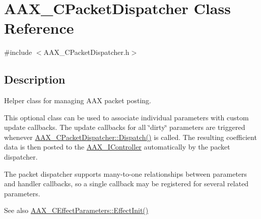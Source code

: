 \hypertarget{a00031}{}\section{A\+A\+X\+\_\+\+C\+Packet\+Dispatcher Class Reference}
\label{a00031}


{\ttfamily \#include $<$A\+A\+X\+\_\+\+C\+Packet\+Dispatcher.\+h$>$}



\subsection{Description}
Helper class for managing A\+A\+X packet posting. 

This optional class can be used to associate individual parameters with custom update callbacks. The update callbacks for all \char`\"{}dirty\char`\"{} parameters are triggered whenever \hyperlink{a00031_aec68e7f8f440e394a3e4ab698a5f06f9}{A\+A\+X\+\_\+\+C\+Packet\+Dispatcher\+::\+Dispatch()} is called. The resulting coefficient data is then posted to the \hyperlink{a00090}{A\+A\+X\+\_\+\+I\+Controller} automatically by the packet dispatcher.

The packet dispatcher supports many-\/to-\/one relationships between parameters and handler callbacks, so a single callback may be registered for several related parameters.

\begin{DoxySeeAlso}{See also}
\hyperlink{a00018_a2e302fd758d39a6a855023bf825fe148}{A\+A\+X\+\_\+\+C\+Effect\+Parameters\+::\+Effect\+Init()} 
\end{DoxySeeAlso}
